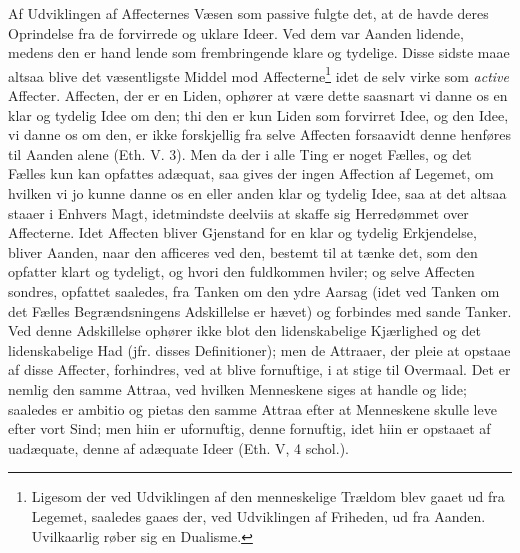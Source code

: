 \documentclass[12pt,a4paper]{book}
\newcommand{\opage}[1]{\marginnote{\footnotesize\textit{[#1]}}}
\begin{document}
Af Udviklingen af Affecternes Væsen som passive fulgte
det, at de havde deres Oprindelse fra de forvirrede og uklare
Ideer. Ved dem var Aanden lidende, medens den er hand\-%
\opage{163}\setcounter{footnote}{0}%
lende som frembringende klare og tydelige. Disse sidste
maae altsaa blive det væsentligste Middel mod Affecterne\footnote{Ligesom der ved Udviklingen af den menneskelige Trældom blev
gaaet ud fra Legemet, saaledes gaaes der, ved Udviklingen af Friheden,
ud fra Aanden. Uvilkaarlig røber sig en Dualisme.}
idet de selv virke som \emph{active} Affecter. Affecten, der er
en Liden, ophører at være dette saasnart vi danne os en
klar og tydelig Idee om den; thi den er kun Liden som
forvirret Idee, og den Idee, vi danne os om den, er ikke
forskjellig fra selve Affecten forsaavidt denne henføres til
Aanden alene (Eth. V. 3). Men da der i alle Ting er noget
Fælles, og det Fælles kun kan opfattes adæquat, saa gives
der ingen Affection af Legemet, om hvilken vi jo kunne
danne os en eller anden klar og tydelig Idee, saa at det
altsaa staaer i Enhvers Magt, idetmindste deelviis at skaffe
sig Herredømmet over Affecterne. Idet Affecten bliver Gjenstand
for en klar og tydelig Erkjendelse, bliver Aanden,
naar den afficeres ved den, bestemt til at tænke det, som
den opfatter klart og tydeligt, og hvori den fuldkommen
hviler; og selve Affecten sondres, opfattet saaledes, fra
Tanken om den ydre Aarsag (idet ved Tanken om det
Fælles Begrændsningens Adskillelse er hævet) og forbindes
med sande Tanker. Ved denne Adskillelse ophører ikke
blot den lidenskabelige Kjærlighed og det lidenskabelige
Had (jfr. disses Definitioner); men de Attraaer, der pleie
at opstaae af disse Affecter, forhindres, ved at blive fornuftige,
i at stige til Overmaal. Det er nemlig den samme
Attraa, ved hvilken Menneskene siges at handle og lide;
saaledes er ambitio og pietas den samme Attraa efter at
Menneskene skulle leve efter vort Sind; men hiin er ufornuftig,
denne fornuftig, idet hiin er opstaaet af uadæquate,
denne af adæquate Ideer (Eth. V, 4 schol.).
\end{document}
